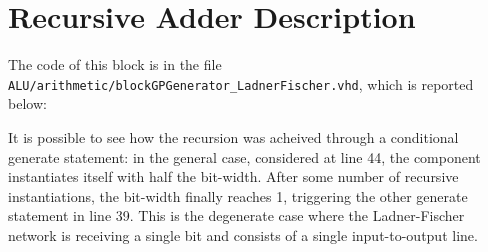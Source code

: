 \section{Recursive Adder Description}
\label{appendix:recursive-adder-description}
The code of this block is in the file \texttt{ALU/arithmetic/blockGPGenerator\_LadnerFischer.vhd}, which is
reported below:


It is possible to see how the recursion was acheived through a conditional generate statement: in the general case,
considered at line 44, the component instantiates itself with half the bit-width.
After some number of recursive instantiations, the bit-width finally reaches 1, triggering the other generate statement
in line 39. This is the degenerate case where the Ladner-Fischer network is receiving a single bit and consists of a
single input-to-output line.
